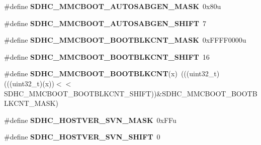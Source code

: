 \begin{DoxyCompactItemize}
\item 
\#define {\bfseries S\+D\+H\+C\+\_\+\+M\+M\+C\+B\+O\+O\+T\+\_\+\+A\+U\+T\+O\+S\+A\+B\+G\+E\+N\+\_\+\+M\+A\+SK}~0x80u\hypertarget{group__SDHC__Register__Masks_gaf80857b20ac681cf157b8012b2cbaaa3}{}\label{group__SDHC__Register__Masks_gaf80857b20ac681cf157b8012b2cbaaa3}

\item 
\#define {\bfseries S\+D\+H\+C\+\_\+\+M\+M\+C\+B\+O\+O\+T\+\_\+\+A\+U\+T\+O\+S\+A\+B\+G\+E\+N\+\_\+\+S\+H\+I\+FT}~7\hypertarget{group__SDHC__Register__Masks_ga2115330345a0a216c1d1721e84b32ea2}{}\label{group__SDHC__Register__Masks_ga2115330345a0a216c1d1721e84b32ea2}

\item 
\#define {\bfseries S\+D\+H\+C\+\_\+\+M\+M\+C\+B\+O\+O\+T\+\_\+\+B\+O\+O\+T\+B\+L\+K\+C\+N\+T\+\_\+\+M\+A\+SK}~0x\+F\+F\+F\+F0000u\hypertarget{group__SDHC__Register__Masks_ga29920c6061ebeaf7ebbba8dadf5bdf21}{}\label{group__SDHC__Register__Masks_ga29920c6061ebeaf7ebbba8dadf5bdf21}

\item 
\#define {\bfseries S\+D\+H\+C\+\_\+\+M\+M\+C\+B\+O\+O\+T\+\_\+\+B\+O\+O\+T\+B\+L\+K\+C\+N\+T\+\_\+\+S\+H\+I\+FT}~16\hypertarget{group__SDHC__Register__Masks_ga353934078a055823e50cdc2564097c67}{}\label{group__SDHC__Register__Masks_ga353934078a055823e50cdc2564097c67}

\item 
\#define {\bfseries S\+D\+H\+C\+\_\+\+M\+M\+C\+B\+O\+O\+T\+\_\+\+B\+O\+O\+T\+B\+L\+K\+C\+NT}(x)~(((uint32\+\_\+t)(((uint32\+\_\+t)(x))$<$$<$S\+D\+H\+C\+\_\+\+M\+M\+C\+B\+O\+O\+T\+\_\+\+B\+O\+O\+T\+B\+L\+K\+C\+N\+T\+\_\+\+S\+H\+I\+FT))\&S\+D\+H\+C\+\_\+\+M\+M\+C\+B\+O\+O\+T\+\_\+\+B\+O\+O\+T\+B\+L\+K\+C\+N\+T\+\_\+\+M\+A\+SK)\hypertarget{group__SDHC__Register__Masks_ga00e933a4a9d5f27c2e1ef6700777e0ea}{}\label{group__SDHC__Register__Masks_ga00e933a4a9d5f27c2e1ef6700777e0ea}

\item 
\#define {\bfseries S\+D\+H\+C\+\_\+\+H\+O\+S\+T\+V\+E\+R\+\_\+\+S\+V\+N\+\_\+\+M\+A\+SK}~0x\+F\+Fu\hypertarget{group__SDHC__Register__Masks_ga922683bd06f7936f2978aac6f943ca90}{}\label{group__SDHC__Register__Masks_ga922683bd06f7936f2978aac6f943ca90}

\item 
\#define {\bfseries S\+D\+H\+C\+\_\+\+H\+O\+S\+T\+V\+E\+R\+\_\+\+S\+V\+N\+\_\+\+S\+H\+I\+FT}~0\hypertarget{group__SDHC__Register__Masks_gab6a2f24b88cbb5db5621995be9e56bcd}{}\label{group__SDHC__Register__Masks_gab6a2f24b88cbb5db5621995be9e56bcd}


\end{DoxyCompactItemize}
